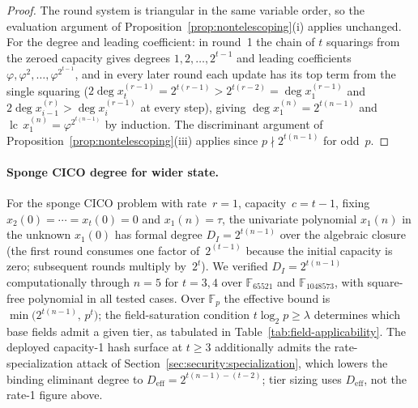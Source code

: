 \documentclass[11pt,a4paper]{article}
\theoremstyle{definition}
\newcommand{\F}{\mathbb{F}}
\newcommand{\Fp}{\mathbb{F}_p}
\begin{document}
\begin{proof}
The round system is triangular in the same variable order, so the
evaluation argument of Proposition~\ref{prop:nontelescoping}(i)
applies unchanged. For the degree and leading coefficient: in round~1
the chain of $t$ squarings from the zeroed capacity gives degrees
$1, 2, \ldots, 2^{t-1}$ and leading coefficients
$\varphi, \varphi^2, \ldots, \varphi^{2^{t-1}}$, and in every later
round each update has its top term from the single squaring
($2 \deg x_t^{(r-1)} = 2^{t(r-1)} > 2^{t(r-2)} = \deg x_1^{(r-1)}$ and
$2 \deg x_{i-1}^{(r)} > \deg x_i^{(r-1)}$ at every step), giving
$\deg x_1^{(n)} = 2^{t(n-1)}$ and
$\operatorname{lc}\, x_1^{(n)} = \varphi^{2^{t(n-1)}}$ by induction.
The discriminant argument of
Proposition~\ref{prop:nontelescoping}(iii) applies since
$p \nmid 2^{t(n-1)}$ for odd~$p$.
\end{proof}

\paragraph{Sponge CICO degree for wider state.}
For the sponge CICO problem with rate~$r=1$, capacity~$c=t-1$,
fixing $x_2(0) = \cdots = x_t(0) = 0$ and
$x_1(n) = \tau$, the univariate polynomial
$x_1(n)$ in the unknown $x_1(0)$ has formal degree
$D_I = 2^{t(n-1)}$ over the algebraic closure (the first round
consumes one factor of~$2^{(t-1)}$ because the initial capacity is
zero; subsequent rounds multiply by~$2^t$).
We verified $D_I = 2^{t(n-1)}$ computationally through $n = 5$ for
$t = 3, 4$ over $\F_{65521}$ and $\F_{1048573}$, with square-free
polynomial in all tested cases. Over $\Fp$ the effective bound is
$\min\!\bigl(2^{t(n-1)},\, p^{t}\bigr)$; the field-saturation
condition $t \log_2 p \ge \lambda$ determines which base fields admit
a given tier, as tabulated in Table~\ref{tab:field-applicability}.
The deployed capacity-1 hash surface at $t \ge 3$ additionally
admits the rate-specialization attack of
Section~\ref{sec:security:specialization}, which lowers the binding
eliminant degree to $D_{\mathrm{eff}} = 2^{t(n-1)-(t-2)}$; tier
sizing uses $D_{\mathrm{eff}}$, not the rate-1 figure above.
\end{document}
